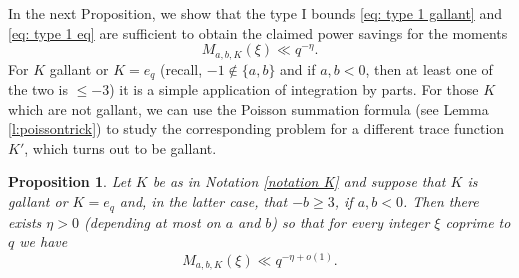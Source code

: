 \documentclass[12pt]{amsart}
\theoremstyle{plain}
\newtheorem{prop}[thm]{Proposition}
\theoremstyle{definition}
\theoremstyle{remark}
\numberwithin{equation}{section}
\renewcommand{\geq}{\geqslant}
\renewcommand{\leq}{\leqslant}
\begin{document}
In the next Proposition, we show that the type I bounds \eqref{eq: type 1 gallant} and \eqref{eq: type 1 eq} are sufficient to obtain the claimed power savings for the moments \[M_{a,b,K}(\xi) \ll q^{-\eta}.\] For $K$ gallant or $K=e_q$ (recall, $-1\notin \{a,b\}$ and if $a,b<0$, then at least one of the two is $\leq -3$) it is a simple application of integration by parts. For those $K$ which are not gallant, we can use the Poisson summation formula (see Lemma \ref{l:poissontrick}) to study the corresponding problem for a different trace function $K'$, which turns out to be gallant.

\begin{prop}\label{prop: bound with cut of fct}Let $K$ be as in Notation \ref{notation K} and suppose that $K$ is gallant or $K=e_q$ and, in the latter case, that $-b\geq 3$, if $a,b<0$. Then there exists $\eta >0$ (depending at most on $a$ and $b$) so that for every integer $\xi$ coprime to $q$ we have
    \[M_{a,b,K}(\xi) \ll q^{- \eta  + o(1)}. \]
\end{prop}
\end{document}

